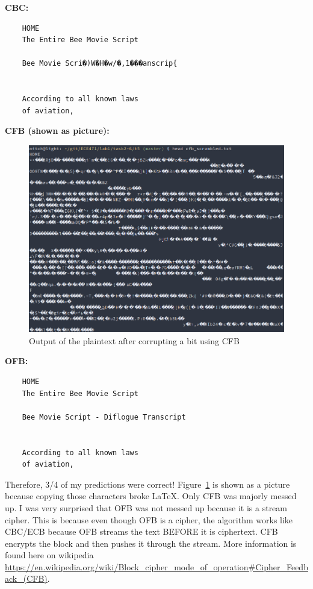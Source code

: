 \documentclass[12pt]{article}
\begin{document}
\textbf{CBC:}
\begin{verbatim}
    HOME
    The Entire Bee Movie Script
    
    Bee Movie Scri�)W�H�w/�,1���anscrip{
    
    
    According to all known laws
    of aviation,
\end{verbatim}

\textbf{CFB (shown as picture):}
\begin{figure}[H]
    \begin{center}
        \includegraphics[scale=0.4]{t5p4.png}
    \end{center}{}
    \caption{Output of the plaintext after corrupting a bit using CFB}
    \label{fig:t5p4}
\end{figure}

\textbf{OFB:}
\begin{verbatim}
    HOME
    The Entire Bee Movie Script
    
    Bee Movie Script - Diflogue Transcript
    
    
    According to all known laws
    of aviation,
\end{verbatim}

Therefore, 3/4 of my predictions were correct! Figure~\ref{fig:t5p4} is shown as a picture because copying those characters broke LaTeX. Only CFB was majorly messed up. I was very surprised that OFB was not messed up because it is a stream cipher. This is because even though OFB is a cipher, the algorithm works like CBC/ECB because OFB streams the text BEFORE it is ciphertext. CFB encrypts the block and then pushes it through the stream. More information is found here on wikipedia \url{https://en.wikipedia.org/wiki/Block_cipher_mode_of_operation#Cipher_Feedback_(CFB)}.
\end{document}

